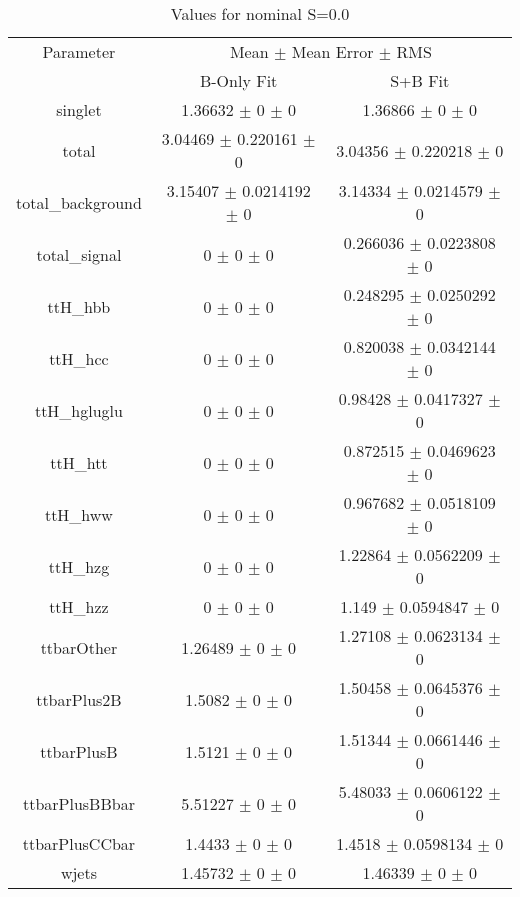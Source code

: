 \begin{table}
\centering
\caption{Values for nominal S=0.0}
\begin{tabular}{ccc}
\toprule
Parameter & \multicolumn{2}{c}{Mean $\pm$ Mean Error $\pm$ RMS}\\
 & B-Only Fit & S+B Fit\\
\midrule
singlet & \num{1.36632} $\pm$ \num{0} $\pm$ \num{0} & \num{1.36866} $\pm$ \num{0} $\pm$ \num{0}\\
total & \num{3.04469} $\pm$ \num{0.220161} $\pm$ \num{0} & \num{3.04356} $\pm$ \num{0.220218} $\pm$ \num{0}\\
total\_background & \num{3.15407} $\pm$ \num{0.0214192} $\pm$ \num{0} & \num{3.14334} $\pm$ \num{0.0214579} $\pm$ \num{0}\\
total\_signal & \num{0} $\pm$ \num{0} $\pm$ \num{0} & \num{0.266036} $\pm$ \num{0.0223808} $\pm$ \num{0}\\
ttH\_hbb & \num{0} $\pm$ \num{0} $\pm$ \num{0} & \num{0.248295} $\pm$ \num{0.0250292} $\pm$ \num{0}\\
ttH\_hcc & \num{0} $\pm$ \num{0} $\pm$ \num{0} & \num{0.820038} $\pm$ \num{0.0342144} $\pm$ \num{0}\\
ttH\_hgluglu & \num{0} $\pm$ \num{0} $\pm$ \num{0} & \num{0.98428} $\pm$ \num{0.0417327} $\pm$ \num{0}\\
ttH\_htt & \num{0} $\pm$ \num{0} $\pm$ \num{0} & \num{0.872515} $\pm$ \num{0.0469623} $\pm$ \num{0}\\
ttH\_hww & \num{0} $\pm$ \num{0} $\pm$ \num{0} & \num{0.967682} $\pm$ \num{0.0518109} $\pm$ \num{0}\\
ttH\_hzg & \num{0} $\pm$ \num{0} $\pm$ \num{0} & \num{1.22864} $\pm$ \num{0.0562209} $\pm$ \num{0}\\
ttH\_hzz & \num{0} $\pm$ \num{0} $\pm$ \num{0} & \num{1.149} $\pm$ \num{0.0594847} $\pm$ \num{0}\\
ttbarOther & \num{1.26489} $\pm$ \num{0} $\pm$ \num{0} & \num{1.27108} $\pm$ \num{0.0623134} $\pm$ \num{0}\\
ttbarPlus2B & \num{1.5082} $\pm$ \num{0} $\pm$ \num{0} & \num{1.50458} $\pm$ \num{0.0645376} $\pm$ \num{0}\\
ttbarPlusB & \num{1.5121} $\pm$ \num{0} $\pm$ \num{0} & \num{1.51344} $\pm$ \num{0.0661446} $\pm$ \num{0}\\
ttbarPlusBBbar & \num{5.51227} $\pm$ \num{0} $\pm$ \num{0} & \num{5.48033} $\pm$ \num{0.0606122} $\pm$ \num{0}\\
ttbarPlusCCbar & \num{1.4433} $\pm$ \num{0} $\pm$ \num{0} & \num{1.4518} $\pm$ \num{0.0598134} $\pm$ \num{0}\\
wjets & \num{1.45732} $\pm$ \num{0} $\pm$ \num{0} & \num{1.46339} $\pm$ \num{0} $\pm$ \num{0}\\
\bottomrule
\end{tabular}
\end{table}